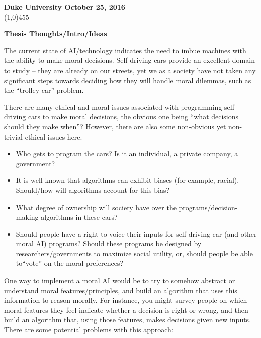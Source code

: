 \documentclass[11pt]{article}
\theoremstyle{definition}
\begin{document}
\noindent \textbf{Duke University  \hfill  October 25, 2016} \\
\line(1,0){455}
    
\begin{center}
\Large{{\bf Thesis Thoughts/Intro/Ideas}}\\
\end{center}

The current state of AI/technology indicates the need to imbue machines with the ability to make moral decisions. Self driving cars provide an excellent domain to study -- they are already on our streets, yet we as a society have not taken any significant steps towards deciding how they will handle moral dilemmas, such as the ``trolley car'' problem. 

There are many ethical and moral issues associated with programming self driving cars to make moral decisions, the obvious one being ``what decisions should they make when''? However, there are also some non-obvious yet non-trivial ethical issues here.

\begin{itemize}
\item Who gets to program the cars? Is it an individual, a private company, a government?
\item It is well-known that algorithms can exhibit biases (for example, racial). Should/how will algorithms account for this bias?
\item What degree of ownership will society have over the programs/decision-making algorithms in these cars? 
\item Should people have a right to voice their inputs for self-driving car (and other moral AI) programs? Should these programs be designed by researchers/governments to maximize social utility, or, should people be able to``vote'' on the moral preferences?
\end{itemize}
One way to implement a moral AI would be to try to somehow abstract or understand moral features/principles, and build an algorithm that uses this information to reason morally. For instance, you might survey people on which moral features they feel indicate whether a decision is right or wrong, and then build an algorithm that, using those features, makes decisions given new inputs. There are some potential problems with this approach:
\end{document}
